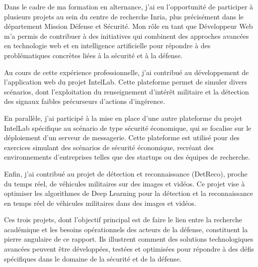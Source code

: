 \sloppy

Dans le cadre de ma formation en alternance, j'ai eu l'opportunité de participer à plusieurs projets au sein du centre de recherche Inria, plus précisément dans le département Mission Défense et Sécurité.
Mon rôle en tant que Développeur Web m'a permis de contribuer à des initiatives qui combinent des approches avancées en technologie web et en intelligence artificielle pour répondre à des problématiques concrètes liées à la sécurité et à la défense.

Au cours de cette expérience professionnelle, j'ai contribué au développement de l'application web du projet IntelLab.
Cette plateforme permet de simuler divers scénarios, dont l'exploitation du renseignement d'intérêt militaire et la détection des signaux faibles précurseurs d'actions d'ingérence.

En parallèle, j'ai participé à la mise en place d'une autre plateforme du projet IntelLab spécifique au scénario de type sécurité économique, qui se focalise sur le déploiement d'un serveur de messagerie.
Cette plateforme est utilisé pour des exercices simulant des scénarios de sécurité économique, recréant des environnements d'entreprises telles que des startups ou des équipes de recherche.

Enfin, j'ai contribué au projet de détection et reconnaissance (DetReco), proche du temps réel, de véhicules militaires sur des images et vidéos.
Ce projet vise à optimiser les algorithmes de Deep Learning pour la détection et la reconnaissance en temps réel de véhicules militaires dans des images et vidéos.

Ces trois projets, dont l'objectif principal est de faire le lien entre la recherche académique et les besoins opérationnels des acteurs de la défense, constituent la pierre angulaire de ce rapport.
Ils illustrent comment des solutions technologiques avancées peuvent être développées, testées et optimisées pour répondre à des défis spécifiques dans le domaine de la sécurité et de la défense.

